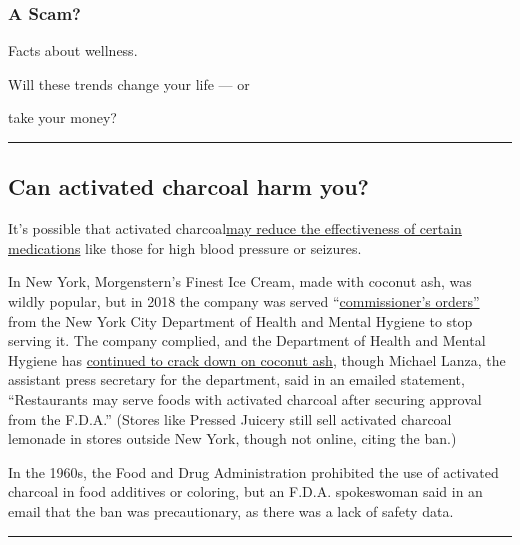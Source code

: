 \hypertarget{a-scam}{%
\subsubsection{A Scam?}\label{a-scam}}

Facts about wellness.

Will these trends change your life --- or

take your money?

\begin{center}\rule{0.5\linewidth}{\linethickness}\end{center}

\hypertarget{can-activated-charcoal-harm-you}{%
\subsection{Can activated charcoal harm
you?}\label{can-activated-charcoal-harm-you}}

It's possible that activated
charcoal\href{https://www.ncbi.nlm.nih.gov/m/pubmed/3285126/}{may reduce
the effectiveness of certain medications} like those for high blood
pressure or seizures.

In New York, Morgenstern's Finest Ice Cream, made with coconut ash, was
wildly popular, but in 2018 the company was served
``\href{https://ny.eater.com/2018/6/7/17435290/activated-charcoal-food-nyc}{commissioner's
orders''} from the New York City Department of Health and Mental Hygiene
to stop serving it. The company complied, and the Department of Health
and Mental Hygiene has
\href{https://www.techtimes.com/articles/229677/20180607/new-york-city-department-of-health-bans-black-foods-that-contain-activated-charcoal.htm}{continued
to crack down on coconut ash}, though Michael Lanza, the assistant press
secretary for the department, said in an emailed statement,
``Restaurants may serve foods with activated charcoal after securing
approval from the F.D.A.'' (Stores like Pressed Juicery still sell
activated charcoal lemonade in stores outside New York, though not
online, citing the ban.)

In the 1960s, the Food and Drug Administration prohibited the use of
activated charcoal in food additives or coloring, but an F.D.A.
spokeswoman said in an email that the ban was precautionary, as there
was a lack of safety data.

\begin{center}\rule{0.5\linewidth}{\linethickness}\end{center}

